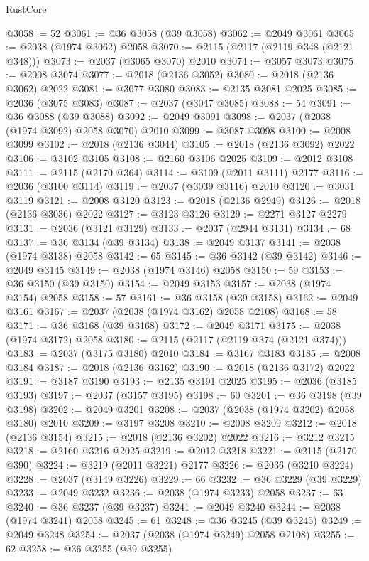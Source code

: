 \begin{lexlean}{RustCore}
\begin{coremodule}
@3058 := 52
@3061 := @36 @3058 (@39 @3058)
@3062 := @2049 @3061
@3065 := @2038 (@1974 @3062) @2058
@3070 := @2115 (@2117 (@2119 @348 (@2121 @348)))
@3073 := @2037 (@3065 @3070) @2010
@3074 := @3057 @3073
@3075 := @2008 @3074
@3077 := @2018 (@2136 @3052)
@3080 := @2018 (@2136 @3062) @2022
@3081 := @3077 @3080
@3083 := @2135 @3081 @2025
@3085 := @2036 (@3075 @3083)
@3087 := @2037 (@3047 @3085)
@3088 := 54
@3091 := @36 @3088 (@39 @3088)
@3092 := @2049 @3091
@3098 := @2037 (@2038 (@1974 @3092) @2058 @3070) @2010
@3099 := @3087 @3098
@3100 := @2008 @3099
@3102 := @2018 (@2136 @3044)
@3105 := @2018 (@2136 @3092) @2022
@3106 := @3102 @3105
@3108 := @2160 @3106 @2025
@3109 := @2012 @3108
@3111 := @2115 (@2170 @364)
@3114 := @3109 (@2011 @3111) @2177
@3116 := @2036 (@3100 @3114)
@3119 := @2037 (@3039 @3116) @2010
@3120 := @3031 @3119
@3121 := @2008 @3120
@3123 := @2018 (@2136 @2949)
@3126 := @2018 (@2136 @3036) @2022
@3127 := @3123 @3126
@3129 := @2271 @3127 @2279
@3131 := @2036 (@3121 @3129)
@3133 := @2037 (@2944 @3131)
@3134 := 68
@3137 := @36 @3134 (@39 @3134)
@3138 := @2049 @3137
@3141 := @2038 (@1974 @3138) @2058
@3142 := 65
@3145 := @36 @3142 (@39 @3142)
@3146 := @2049 @3145
@3149 := @2038 (@1974 @3146) @2058
@3150 := 59
@3153 := @36 @3150 (@39 @3150)
@3154 := @2049 @3153
@3157 := @2038 (@1974 @3154) @2058
@3158 := 57
@3161 := @36 @3158 (@39 @3158)
@3162 := @2049 @3161
@3167 := @2037 (@2038 (@1974 @3162) @2058 @2108)
@3168 := 58
@3171 := @36 @3168 (@39 @3168)
@3172 := @2049 @3171
@3175 := @2038 (@1974 @3172) @2058
@3180 := @2115 (@2117 (@2119 @374 (@2121 @374)))
@3183 := @2037 (@3175 @3180) @2010
@3184 := @3167 @3183
@3185 := @2008 @3184
@3187 := @2018 (@2136 @3162)
@3190 := @2018 (@2136 @3172) @2022
@3191 := @3187 @3190
@3193 := @2135 @3191 @2025
@3195 := @2036 (@3185 @3193)
@3197 := @2037 (@3157 @3195)
@3198 := 60
@3201 := @36 @3198 (@39 @3198)
@3202 := @2049 @3201
@3208 := @2037 (@2038 (@1974 @3202) @2058 @3180) @2010
@3209 := @3197 @3208
@3210 := @2008 @3209
@3212 := @2018 (@2136 @3154)
@3215 := @2018 (@2136 @3202) @2022
@3216 := @3212 @3215
@3218 := @2160 @3216 @2025
@3219 := @2012 @3218
@3221 := @2115 (@2170 @390)
@3224 := @3219 (@2011 @3221) @2177
@3226 := @2036 (@3210 @3224)
@3228 := @2037 (@3149 @3226)
@3229 := 66
@3232 := @36 @3229 (@39 @3229)
@3233 := @2049 @3232
@3236 := @2038 (@1974 @3233) @2058
@3237 := 63
@3240 := @36 @3237 (@39 @3237)
@3241 := @2049 @3240
@3244 := @2038 (@1974 @3241) @2058
@3245 := 61
@3248 := @36 @3245 (@39 @3245)
@3249 := @2049 @3248
@3254 := @2037 (@2038 (@1974 @3249) @2058 @2108)
@3255 := 62
@3258 := @36 @3255 (@39 @3255)

\end{coremodule}
\end{lexlean}

